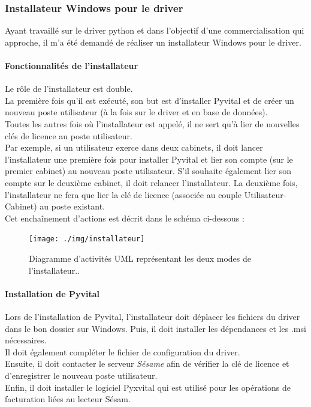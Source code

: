 \subsubsection{Installateur Windows pour le driver}
Ayant travaillé sur le driver python et dans l'objectif d'une commercialisation qui approche, il m'a été demandé de réaliser un installateur Windows pour le driver.

\paragraph*{Fonctionnalités de l'installateur\\}
Le rôle de l'installateur est double.\\ 
La première fois qu'il est exécuté, son but est d'installer Pyvital et de créer un nouveau poste utilisateur (à la fois sur le driver et en base de données). \\
Toutes les autres fois où l'installateur est appelé, il ne sert qu'à lier de nouvelles clés de licence au poste utilisateur.\\
Par exemple, si un utilisateur exerce dans deux cabinets, il doit lancer l'installateur une première fois pour installer Pyvital et lier son compte (sur le premier cabinet) au nouveau poste utilisateur.
S’il souhaite également lier son compte sur le deuxième cabinet, il doit relancer l'installateur. La deuxième fois, l'installateur ne fera que lier la clé de licence (associée au couple Utilisateur-Cabinet) au poste existant.\\
Cet enchaînement d'actions est décrit dans le schéma ci-dessous : 
\begin{figure}[H]
  \vspace{0pt}
  \centering
  \texttt{[image: ./img/installateur]}
  \caption{\label{fig:installateur} Diagramme d'activités UML représentant les deux modes de l'installateur..}
\end{figure}

\paragraph*{Installation de Pyvital\\}
Lors de l'installation de Pyvital, l'installateur doit déplacer les fichiers du driver dans le bon dossier sur Windows. Puis, il doit installer les dépendances et les .msi nécessaires.\\ 
Il doit également compléter le fichier de configuration du driver. \\
Ensuite, il doit contacter le serveur \textit{Sésame} afin de vérifier la clé de licence et d'enregistrer le nouveau poste utilisateur. \\
Enfin, il doit installer le logiciel Pyxvital qui est utilisé pour les opérations de facturation liées au lecteur Sésam.

